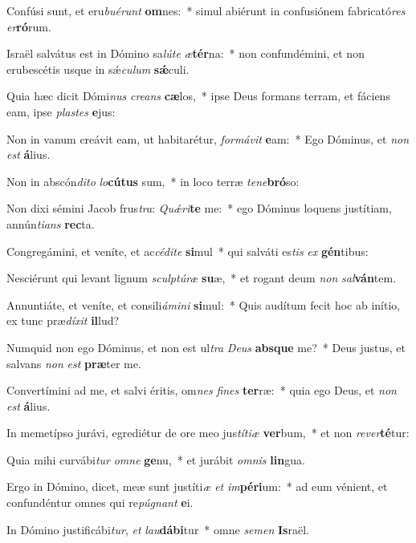 \item Confúsi sunt, et eru\textit{bu}\textit{é}\textit{runt} \textbf{om}nes:~* simul abiérunt in confusiónem fabricató\textit{res} \textit{er}\textbf{ró}rum.
\item Israël salvátus est in Dómino sa\textit{lú}\textit{te} \textit{æ}\textbf{tér}na:~* non confundémini, et non erubescétis usque in sǽ\textit{cu}\textit{lum} \textbf{sǽ}culi.
\item Quia hæc dicit Dómi\textit{nus} \textit{cre}\textit{ans} \textbf{cæ}los,~* ipse Deus formans terram, et fáciens eam, ipse \textit{plas}\textit{tes} \textbf{e}jus:
\item Non in vanum creávit eam, ut habitarétur, \textit{for}\textit{má}\textit{vit} \textbf{e}am:~* Ego Dóminus, et \textit{non} \textit{est} \textbf{á}lius.
\item Non in abscón\textit{di}\textit{to} \textit{lo}\textbf{cú}\textbf{tus} sum,~* in loco terræ \textit{te}\textit{ne}\textbf{bró}so:
\item Non dixi sémini Jacob frus\textit{tra}: \textit{Quǽ}\textit{ri}\textbf{te} me:~* ego Dóminus loquens justítiam, annún\textit{ti}\textit{ans} \textbf{rec}ta.
\item Congregámini, et veníte, et ac\textit{cé}\textit{di}\textit{te} \textbf{si}mul~* qui salváti es\textit{tis} \textit{ex} \textbf{gén}tibus:
\item Nesciérunt qui levant lignum \textit{sculp}\textit{tú}\textit{ræ} \textbf{su}æ,~* et rogant deum \textit{non} \textit{sal}\textbf{ván}tem.
\item Annuntiáte, et veníte, et consili\textit{á}\textit{mi}\textit{ni} \textbf{si}mul:~* Quis audítum fecit hoc ab inítio, ex tunc præ\textit{dí}\textit{xit} \textbf{il}lud?
\item Numquid non ego Dóminus, et non est ul\textit{tra} \textit{De}\textit{us} \textbf{abs}\textbf{que} me?~* Deus justus, et salvans \textit{non} \textit{est} \textbf{præ}ter me.
\item Convertímini ad me, et salvi éritis, om\textit{nes} \textit{fi}\textit{nes} \textbf{ter}ræ:~* quia ego Deus, et \textit{non} \textit{est} \textbf{á}lius.
\item In memetípso jurávi, egrediétur de ore meo jus\textit{tí}\textit{ti}\textit{æ} \textbf{ver}bum,~* et non \textit{re}\textit{ver}\textbf{té}tur:
\item Quia mihi curvábi\textit{tur} \textit{om}\textit{ne} \textbf{ge}nu,~* et jurábit \textit{om}\textit{nis} \textbf{lin}gua.
\item Ergo in Dómino, dicet, meæ sunt justíti\textit{æ} \textit{et} \textit{im}\textbf{pé}\textbf{ri}um:~* ad eum vénient, et confundéntur omnes qui re\textit{pú}\textit{gnant} \textbf{e}i.
\item In Dómino justificábi\textit{tur}, \textit{et} \textit{lau}\textbf{dá}\textbf{bi}tur~* omne \textit{se}\textit{men} \textbf{Is}raël.
